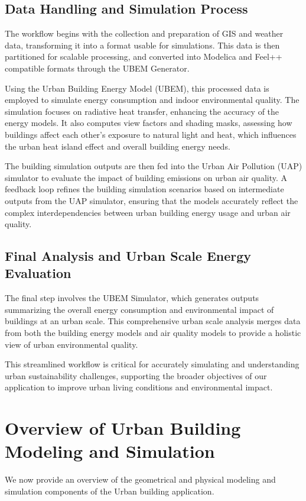 \documentclass[runningheads]{llncs}
\begin{document}
\subsection{Data Handling and Simulation Process}
The workflow begins with the collection and preparation of GIS and weather data, transforming it into a format usable for simulations. This data is then partitioned for scalable processing, and converted into Modelica and Feel++ compatible formats through the UBEM Generator.

Using the Urban Building Energy Model (UBEM), this processed data is employed to simulate energy consumption and indoor environmental quality. The simulation focuses on radiative heat transfer, enhancing the accuracy of the energy models. It also computes view factors and shading masks, assessing how buildings affect each other’s exposure to natural light and heat, which influences the urban heat island effect and overall building energy needs.

The building simulation outputs are then fed into the Urban Air Pollution (UAP) simulator to evaluate the impact of building emissions on urban air quality. A feedback loop refines the building simulation scenarios based on intermediate outputs from the UAP simulator, ensuring that the models accurately reflect the complex interdependencies between urban building energy usage and urban air quality.

\subsection{Final Analysis and Urban Scale Energy Evaluation}
The final step involves the UBEM Simulator, which generates outputs summarizing the overall energy consumption and environmental impact of buildings at an urban scale. This comprehensive urban scale analysis merges data from both the building energy models and air quality models to provide a holistic view of urban environmental quality.

This streamlined workflow is critical for accurately simulating and understanding urban sustainability challenges, supporting the broader objectives of our application to improve urban living conditions and environmental impact.


\section{Overview of Urban Building Modeling and Simulation}

We now provide an overview of the geometrical and physical modeling and simulation components of the Urban building application.
\end{document}
